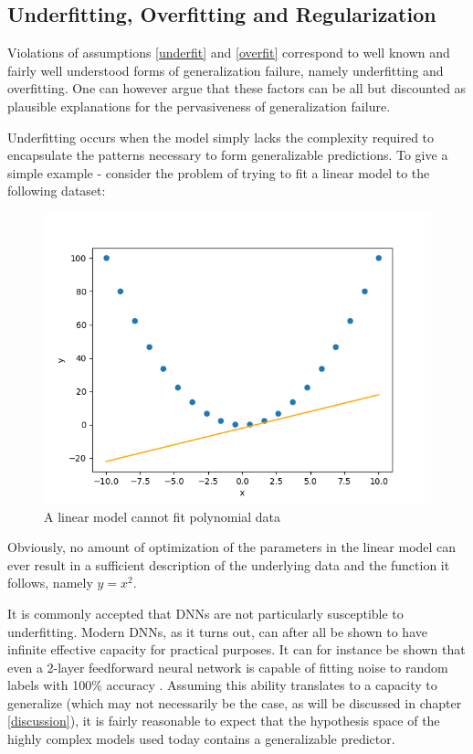 	\subsection{Underfitting, Overfitting and Regularization}
		Violations of assumptions \ref{underfit} and \ref{overfit} correspond to well known and fairly well understood forms of generalization failure, namely underfitting and overfitting. One can however argue that these factors can be all but discounted as plausible explanations for the pervasiveness of generalization failure. 
		
		Underfitting occurs when the model simply lacks the complexity required to encapsulate the patterns necessary to form generalizable predictions. To give a simple example - consider the problem of trying to fit a linear model to the following dataset: 
		\begin{figure}[h]
			\includegraphics[width=\linewidth]{illustrations/regression_example.png}
			\caption{A linear model cannot fit polynomial data}
			\label{underfit example}
		\end{figure}
		Obviously, no amount of optimization of the parameters in the linear model can ever result in a sufficient description of the underlying data and the function it follows, namely \(y=x^2\). 
		
		It is commonly accepted that DNNs are not particularly susceptible to underfitting. Modern DNNs, as it turns out, can after all be shown to have infinite effective capacity for practical purposes. It can for instance be shown that even a 2-layer feedforward neural network is capable of fitting noise to random labels with 100\% accuracy \cite{randomlabels}. Assuming this ability translates to a capacity to generalize (which may not necessarily be the case, as will be discussed in chapter \ref{discussion}), it is fairly reasonable to expect that the hypothesis space of the highly complex models used today contains a generalizable predictor. 

